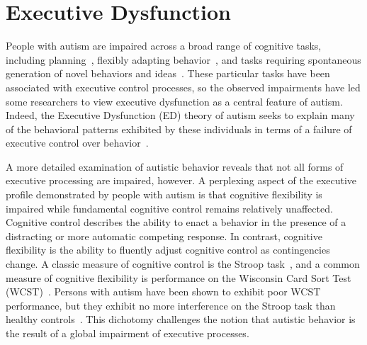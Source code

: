 %
%

\section{Executive Dysfunction}
People with autism are impaired across a broad range of cognitive tasks, including
planning~\cite{BennettoL:1996:AutismPlanningWCST}, flexibly adapting
behavior~\cite{BennettoL:1996:AutismPlanningWCST,Ozonoff:1999:AutismStroopWCST},
and tasks requiring spontaneous generation of novel behaviors and
ideas~\cite{TurnerW:1999:AutismGenerativity}.  These particular tasks have
been associated with executive control processes, so the observed
impairments have led some researchers to view executive dysfunction as
a central feature of autism.  Indeed, the Executive Dysfunction (ED)
theory of autism seeks to explain many of the behavioral patterns
exhibited by these individuals in terms of a failure of executive
control over behavior~\cite{HughesC:1994:AutismExecutiveDysfunction}.


A more detailed examination of autistic behavior reveals that not all
forms of executive processing are impaired, however.  A 
perplexing aspect of the executive profile demonstrated by people with
autism is that cognitive flexibility is impaired
while fundamental cognitive control remains relatively
unaffected.  Cognitive control describes the ability to enact a
behavior in the presence of a distracting or more automatic competing
response.  In contrast, cognitive flexibility is the
ability to fluently adjust cognitive control as contingencies change.
A classic measure of cognitive control is the Stroop
task~\cite{StroopJR:1935:Interference}, and a common measure of
cognitive flexibility is performance on the Wisconsin Card Sort Test
(WCST)~\cite{BergEA:1948:WCST}.  Persons with autism have been shown
to exhibit poor WCST performance, but they exhibit no more
interference on the Stroop task than healthy
controls~\cite{Ozonoff:1999:AutismStroopWCST}.  This dichotomy
challenges the notion that autistic behavior is the result of a global
impairment of executive processes.%


